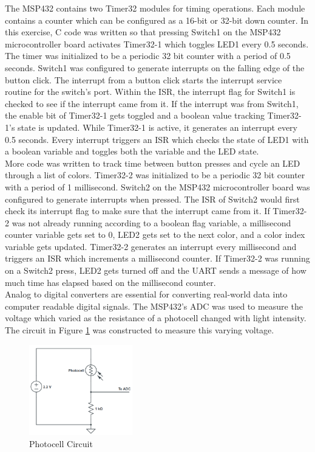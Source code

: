 \documentclass[CMPE]{KGCOEReport}
\begin{document}
The MSP432 contains two Timer32 modules for timing operations. Each module contains a counter which can be configured as a 16-bit or 32-bit down counter. In this exercise, C code was written so that pressing Switch1 on the MSP432 microcontroller board activates Timer32-1 which toggles LED1 every 0.5 seconds. The timer was initialized to be a periodic 32 bit counter with a period of 0.5 seconds. Switch1 was configured to generate interrupts on the falling edge of the button click. The interrupt from a button click starts the interrupt service routine for the switch's port. Within the ISR, the interrupt flag for Switch1 is checked to see if the interrupt came from it. If the interrupt was from Switch1, the enable bit of Timer32-1 gets toggled and a boolean value tracking Timer32-1's state is updated. While Timer32-1 is active, it generates an interrupt every 0.5 seconds. Every interrupt triggers an ISR which checks the state of LED1 with a boolean variable and toggles both the variable and the LED state.\\

More code was written to track time between button presses and cycle an LED through a list of colors. Timer32-2 was initialized to be a periodic 32 bit counter with a period of 1 millisecond. Switch2 on the MSP432 microcontroller board was configured to generate interrupts when pressed. The ISR of Switch2 would first check its interrupt flag to make sure that the interrupt came from it. If Timer32-2 was not already running according to a boolean flag variable, a millisecond counter variable gets set to 0, LED2 gets set to the next color, and a color index variable gets updated. Timer32-2 generates an interrupt every millisecond and triggers an ISR which increments a millisecond counter. If Timer32-2 was running on a Switch2 press, LED2 gets turned off and the UART sends a message of how much time has elapsed based on the millisecond counter. \\

Analog to digital converters are essential for converting real-world data into computer readable digital signals. The MSP432's ADC was used to measure the voltage which varied as the resistance of a photocell changed with light intensity.  The circuit in Figure \ref{fig:photocell} was constructed to measure this varying voltage.

\begin{figure}[H]
    \centering
    \includegraphics[width=0.4\textwidth]{photocellCircuit.png}
    \caption{Photocell Circuit}
    \label{fig:photocell}
\end{figure}
\end{document}
